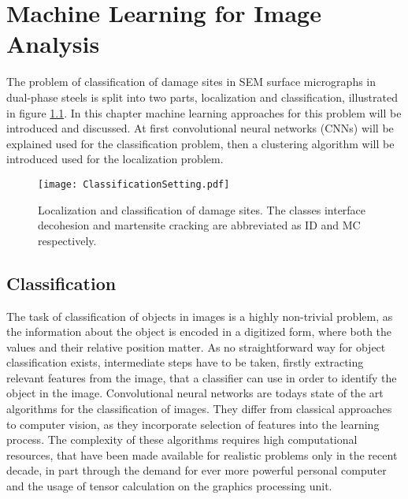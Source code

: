 
\chapter{Machine Learning for Image Analysis} %

\label{CNN} %

The problem of classification of damage sites in SEM surface micrographs in dual-phase steels is split into two parts, localization and classification, illustrated in figure \ref{fig:DPSteelProblem}. In this chapter machine learning approaches for this problem will be introduced and discussed. At first convolutional neural networks (CNNs) will be explained used for the classification problem, then a clustering algorithm will be introduced used for the localization problem. \\

\begin{figure}
\centering
\texttt{[image: ClassificationSetting.pdf]}
\caption{Localization and classification of damage sites. The classes interface decohesion and martensite cracking are abbreviated as ID and MC respectively.}
\label{fig:DPSteelProblem}
\end{figure}

\section{Classification}

The task of classification of objects in images is a highly non-trivial problem, as the information about the object is encoded in a digitized form, where both the values and their relative position matter. As no straightforward way for object classification exists, intermediate steps have to be taken, firstly extracting relevant features from the image, that a classifier can use in order to identify the object in the image. Convolutional neural networks are todays state of the art algorithms for the classification of images. They differ from classical approaches to computer vision, as they incorporate selection of features into the learning process. The complexity of these algorithms requires high computational resources, that have been made available for realistic problems only in the recent decade, in part through the demand for ever more powerful personal computer and the usage of tensor calculation on the graphics processing unit. \\


